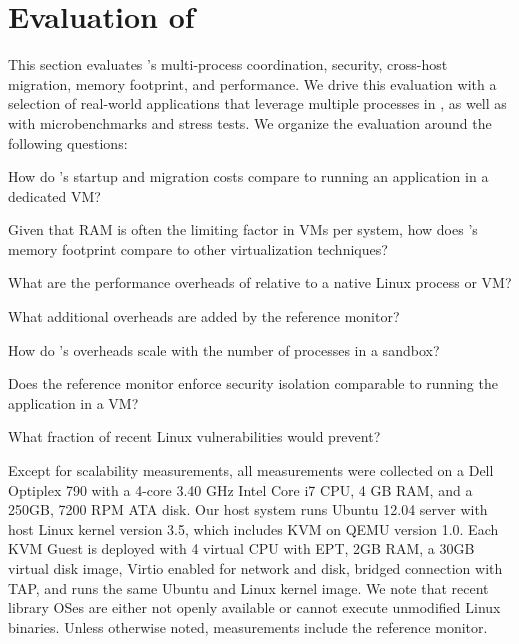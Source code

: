 
\section{Evaluation of \sysname{}}
\label{sec:graphene:eval}



This section evaluates \sysname{}'s multi-process coordination, security, cross-host migration, memory footprint, and performance.
We drive this evaluation with a selection of real-world applications that leverage multiple processes in \sysname{},
as well as with microbenchmarks and stress tests.
We organize the evaluation around the following questions:
\begin{compactenum}
\item How do \sysname{}'s startup and migration costs compare to running an application in a dedicated VM?
\item Given that RAM is often the limiting factor in VMs per system, how does \sysname{}'s memory footprint compare to other virtualization techniques?
\item What are the performance overheads of \sysname{} relative to a native Linux process or VM?
\item What additional overheads are added by the reference monitor?
\item How do \sysname{}'s overheads scale with the number of processes in a sandbox?
\item Does the \sysname{} reference monitor enforce security isolation comparable to running the application in a VM?  
\item What fraction of recent Linux vulnerabilities would \sysname{} prevent?
\end{compactenum}


Except for scalability measurements, 
all measurements were collected on a 
Dell Optiplex 790 with 
a 4-core 3.40 GHz Intel Core i7 CPU,
4 GB RAM, and a 250GB, 7200 RPM ATA disk.
Our host system runs Ubuntu 12.04 server with host Linux kernel version 3.5, 
which includes KVM on 
QEMU version 1.0.
Each KVM Guest is deployed with 4 virtual CPU with EPT, 2GB RAM, a 30GB virtual disk image, Virtio enabled for network and disk, bridged connection with TAP, and runs the same Ubuntu and Linux kernel image.
We note that recent library OSes are either not openly available
or cannot execute unmodified Linux binaries.
Unless otherwise noted, \sysname{} measurements include the reference monitor.

